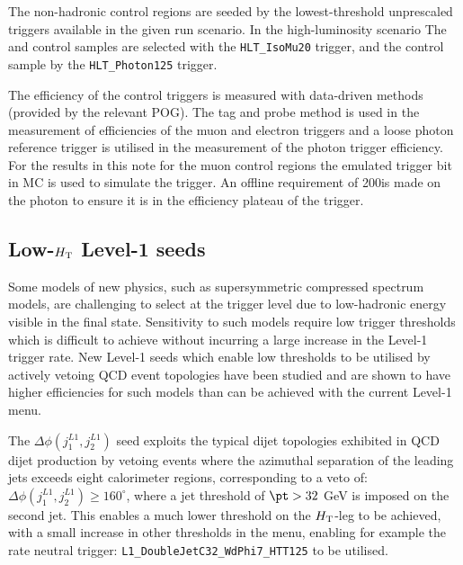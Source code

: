 The non-hadronic control regions are seeded by the lowest-threshold unprescaled 
triggers available in the given run scenario. In the high-luminosity scenario The 
\mj and \mmj control samples are selected with the \verb!HLT_IsoMu20! trigger,
and the \gj control sample by the \verb!HLT_Photon125! trigger. 

The efficiency of the control triggers is measured with data-driven methods
(provided by the relevant POG). The tag and probe method is used in the measurement of
efficiencies of the muon and electron triggers and a loose photon reference trigger 
is utilised in the measurement of the photon trigger efficiency. For the results in 
this note for the muon control regions the emulated trigger bit in MC is used to simulate 
the trigger. An offline \Pt requirement of 200\GeV is made on the photon
to ensure it is in the efficiency plateau of the trigger.








\subsection{Low-$\mbox{$H_\text{T}$}$ Level-1 seeds}

Some models of new physics, such as supersymmetric compressed spectrum models, are challenging to select at the trigger level due to low-hadronic energy visible in the final state. Sensitivity to such models require low trigger thresholds which is difficult to achieve without incurring a large increase in the Level-1 trigger rate. New Level-1 seeds which enable low thresholds to be utilised by actively vetoing QCD event topologies have been studied and are shown to have higher efficiencies for such models than can be achieved with the current Level-1 menu.

The $\Delta\phi(j_{1}^{L1},j_{2}^{L1})$ seed exploits the typical dijet topologies exhibited in QCD dijet production by vetoing events where the azimuthal separation of the leading jets exceeds eight calorimeter regions, corresponding to a veto of: $\Delta\phi(j_{1}^{L1},j_{2}^{L1}) \ge 160^{\circ}$, where a jet threshold of $\pt > 32$ GeV is imposed on the second jet. This enables a much lower threshold on the $\mbox{$H_\text{T}$}$-leg to be achieved, with a small increase in other thresholds in the menu, enabling for example the rate neutral trigger: \verb!L1_DoubleJetC32_WdPhi7_HTT125! to be utilised.

